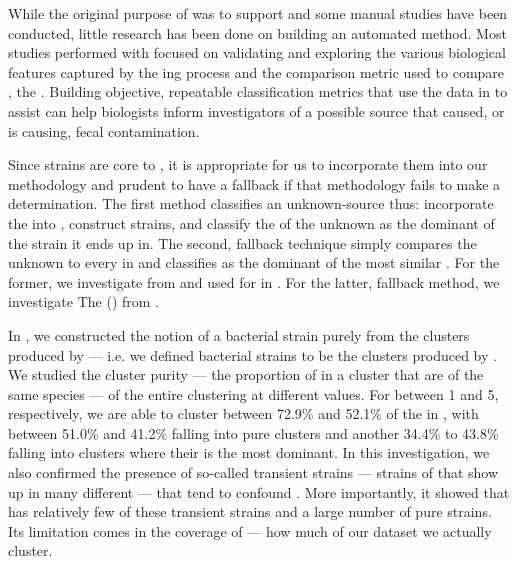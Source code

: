 While the original purpose of \cplop{} was to support \mst{} and some manual \mst{} studies have been conducted, little research has been done on building an automated \mst{} method.
Most studies performed with \cplop{} focused on validating and exploring the various biological features captured by the \pyro{}ing process and the comparison metric used to compare \pyros{}, the \pearson{}.
Building objective, repeatable classification metrics that use the data in \cplop{} to assist \mst{} can help biologists inform investigators of a possible source that caused, or is causing, fecal contamination.

Since strains are core to \cplop{}, it is appropriate for us to incorporate them into our \mst{} methodology and prudent to have a fallback if that methodology fails to make a determination.
The first \mst{} method classifies an unknown-source \isol{} thus: incorporate the \isol{} into \cplop{}, construct strains, and classify the \spec{} of the unknown \isol{} as the dominant \spec{} of the strain it ends up in.
The second, fallback technique simply compares the unknown \isol{} to every \isol{} in \cplop{} and classifies as the dominant \spec{} of the most similar \isols{}.
For the former, we investigate \dbscan{} from \cite{johnson2015density} and used for \mst{} in \cite{DBLP:conf/bcb/McGovernJDBKV16}.
For the latter, fallback method, we investigate The \kraplong{} (\krap{}) from \cite{DBLP:conf/bibm/McGovernDKBVG15}.

In \cite{DBLP:conf/bcb/McGovernJDBKV16}, we constructed the notion of a bacterial strain purely from the clusters produced by \dbscan{} --- i.e. we defined bacterial strains to be the clusters produced by \dbscan{}.
We studied the cluster purity --- the proportion of \isols{} in a cluster that are of the same species --- of the entire clustering at different \minneigh{} values.
For \minneigh{} between 1 and 5, respectively, we are able to cluster between 72.9\% and 52.1\% of the \isols{} in \cplop{}, with between 51.0\% and 41.2\% falling into pure clusters and another 34.4\% to 43.8\% falling into clusters where their \spec{} is the most dominant.
In this investigation, we also confirmed the presence of so-called transient \ecoli{} strains --- strains of \ecoli{} that show up in many different \spec{} --- that tend to confound \mst{}.
More importantly, it showed that \cplop{} has relatively few of these transient strains and a large number of pure strains.
Its limitation comes in the coverage of \cplop{} --- how much of our dataset we actually cluster.

